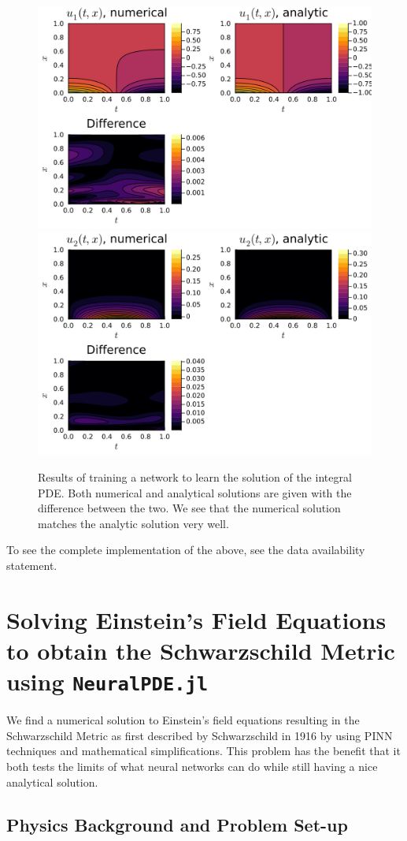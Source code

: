 \documentclass{CUP-JNL-DTM}%
\theoremstyle{definition}
\numberwithin{equation}{section}
\begin{document}
\begin{figure}
\centering
    \includegraphics[width=0.48\linewidth]{figures/integral_PDE_plots/plot_u1.png}
    \includegraphics[width=0.48\linewidth]{figures/integral_PDE_plots/plot_u2.png}
    \caption{Results of training a network to learn the solution of the integral PDE. Both numerical and analytical solutions are given with the difference between the two. We see that the numerical solution matches the analytic solution very well.}
    \label{fig:integro_results}
\end{figure}

To see the complete implementation of the above, see the data availability statement. 


\section{Solving Einstein's Field Equations to obtain the Schwarzschild Metric using \texttt{NeuralPDE.jl}}

We find a numerical solution to Einstein's field equations resulting in the Schwarzschild Metric as first described by Schwarzschild in 1916 \cite{schwarzschildGravitationalFieldMass1999} by using PINN techniques and mathematical simplifications. This problem has the benefit that it both tests the limits of what neural networks can do while still having a nice analytical solution. 

\subsection{Physics Background and Problem Set-up}
\end{document}
